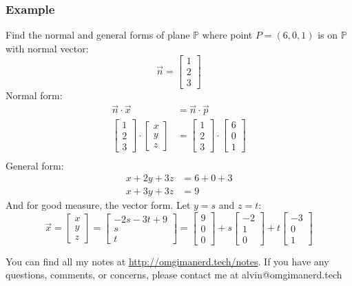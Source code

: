\documentclass[letterpaper, 12pt]{math}
\begin{document}
\subsubsection*{Example}
Find the normal and general forms of plane \( \mathbb{P} \) where point
\( P = (6,0,1) \) is on \( \mathbb{P} \) with normal vector:
\[ \vec{n} = \begin{bmatrix}1 \\ 2 \\ 3\end{bmatrix} \]
Normal form:
\begin{align*}
  \vec{n}\cdot\vec{x} &= \vec{n}\cdot\vec{p} \\
  \begin{bmatrix}1 \\ 2 \\ 3\end{bmatrix}\cdot
    \begin{bmatrix}x \\ y \\ z\end{bmatrix} &=
    \begin{bmatrix}1 \\ 2 \\ 3\end{bmatrix}\cdot
    \begin{bmatrix}6 \\ 0 \\ 1\end{bmatrix} \\
\end{align*}
General form:
\begin{align*}
  x+2y+3z &= 6+0+3 \\
  x+3y+3z &= 9
\end{align*}
And for good measure, the vector form. Let \( y = s \) and \( z = t \):
\[ \vec{x} = \begin{bmatrix}x \\ y \\ z\end{bmatrix} =
  \begin{bmatrix}-2s-3t+9 \\ s \\ t\end{bmatrix} =
  \begin{bmatrix}9 \\ 0 \\ 0\end{bmatrix}+
  s\begin{bmatrix}-2 \\ 1 \\ 0\end{bmatrix}+
  t\begin{bmatrix}-3 \\ 0 \\ 1\end{bmatrix} \]

\begin{center}
  You can find all my notes at \url{http://omgimanerd.tech/notes}. If you have
  any questions, comments, or concerns, please contact me at
  alvin@omgimanerd.tech
\end{center}
\end{document}
